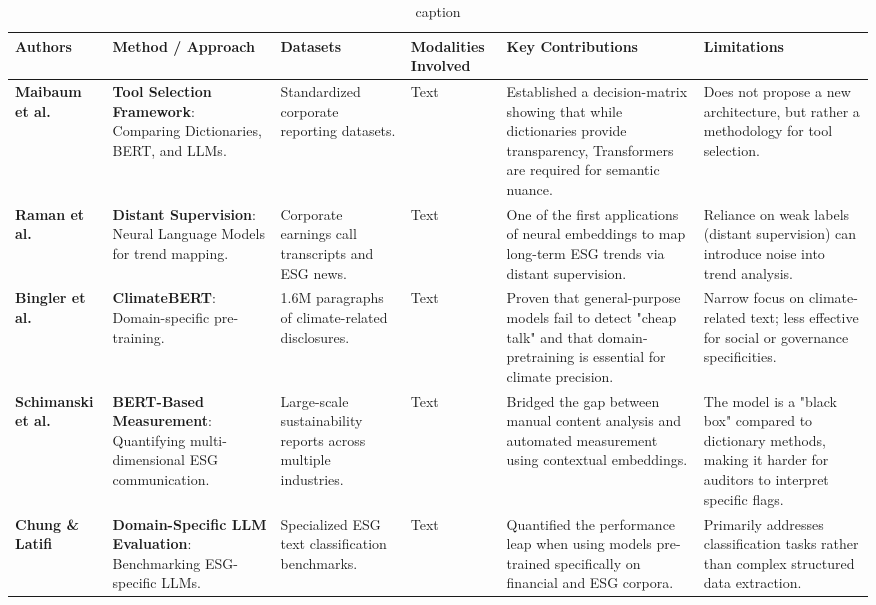 \begin{landscape}
\begin{table}[p]
\centering
\caption{caption}
\label{label}
\small
\renewcommand{\arraystretch}{1.2}
\begin{tabularx}{\linewidth}{|p{1.8cm}|p{3.5cm}|p{3cm}|p{1.8cm}|X|X|}
\hline
Authors & Method / Approach & Datasets & Modalities Involved & Key Contributions & Limitations \\ \hline
\textbf{Maibaum et al.}  \parencite{frederik_maibaum_b8629037} & \textbf{Tool Selection Framework}: Comparing Dictionaries, BERT, and LLMs. & Standardized corporate reporting datasets. & Text & Established a decision-matrix showing that while dictionaries provide transparency, Transformers are required for semantic nuance. & Does not propose a new architecture, but rather a methodology for tool selection. \\ \hline
\textbf{Raman et al.}  \parencite{natraj_raman_009776f2} & \textbf{Distant Supervision}: Neural Language Models for trend mapping. & Corporate earnings call transcripts and ESG news. & Text & One of the first applications of neural embeddings to map long-term ESG trends via distant supervision. & Reliance on weak labels (distant supervision) can introduce noise into trend analysis. \\ \hline
\textbf{Bingler et al.}  \parencite{julia_bingler_268445e3} & \textbf{ClimateBERT}: Domain-specific pre-training. & 1.6M paragraphs of climate-related disclosures. & Text & Proven that general-purpose models fail to detect "cheap talk" and that domain-pretraining is essential for climate precision. & Narrow focus on climate-related text; less effective for social or governance specificities. \\ \hline
\textbf{Schimanski et al.}  \parencite{tobias_schimanski_4e192ec5} & \textbf{BERT-Based Measurement}: Quantifying multi-dimensional ESG communication. & Large-scale sustainability reports across multiple industries. & Text & Bridged the gap between manual content analysis and automated measurement using contextual embeddings. & The model is a "black box" compared to dictionary methods, making it harder for auditors to interpret specific flags. \\ \hline
\textbf{Chung \& Latifi}  \parencite{tae_sun_chung_e16a4c18} & \textbf{Domain-Specific LLM Evaluation}: Benchmarking ESG-specific LLMs. & Specialized ESG text classification benchmarks. & Text & Quantified the performance leap when using models pre-trained specifically on financial and ESG corpora. & Primarily addresses classification tasks rather than complex structured data extraction. \\ \hline

\end{tabularx}
\end{table}
\end{landscape}

